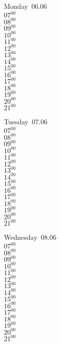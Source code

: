 \documentclass[11pt,a4paper]{book}\usepackage[]{graphicx}\usepackage[]{color}
\begin{document}
\begin{headerbox}
\end{headerbox}
\begin{weekdaybox}
  Monday~06.06\\
  { 
  \vfill
  $07^{00}$\\
$08^{00}$\\
$09^{00}$\\
$10^{00}$\\
$11^{00}$\\
$12^{00}$\\
$13^{00}$\\
$14^{00}$\\
$15^{00}$\\
$16^{00}$\\
$17^{00}$\\
$18^{00}$\\
$19^{00}$\\
$20^{00}$\\
$21^{00}$\\
  }
\end{weekdaybox}
\begin{weekdaybox}
  Tuesday~07.06\\
  { 
  \vfill
  $07^{00}$\\
$08^{00}$\\
$09^{00}$\\
$10^{00}$\\
$11^{00}$\\
$12^{00}$\\
$13^{00}$\\
$14^{00}$\\
$15^{00}$\\
$16^{00}$\\
$17^{00}$\\
$18^{00}$\\
$19^{00}$\\
$20^{00}$\\
$21^{00}$\\
  }
\end{weekdaybox}
\begin{weekdaybox}
  Wednesday~08.06\\
  { 
  \vfill
  $07^{00}$\\
$08^{00}$\\
$09^{00}$\\
$10^{00}$\\
$11^{00}$\\
$12^{00}$\\
$13^{00}$\\
$14^{00}$\\
$15^{00}$\\
$16^{00}$\\
$17^{00}$\\
$18^{00}$\\
$19^{00}$\\
$20^{00}$\\
$21^{00}$\\
  }
\end{weekdaybox}
\end{document}
